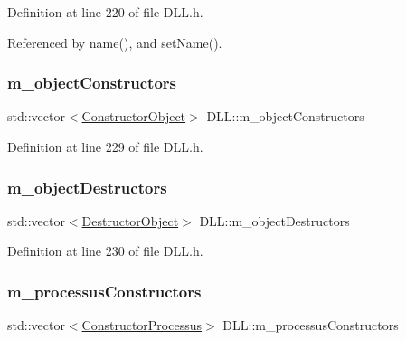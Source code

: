 Definition at line 220 of file D\+L\+L.\+h.



Referenced by name(), and set\+Name().

\mbox{\label{classDLL_a298d605445e22ef8147ae700848cd737}} 
\subsubsection{\texorpdfstring{m\+\_\+object\+Constructors}{m\_objectConstructors}}
{\footnotesize\ttfamily std\+::vector$<$\hyperlink{classDLL_a67b9601085a9f972b9ac6876cd11398e}{Constructor\+Object}$>$ D\+L\+L\+::m\+\_\+object\+Constructors\hspace{0.3cm}{\ttfamily [private]}}



Definition at line 229 of file D\+L\+L.\+h.

\mbox{\label{classDLL_a8c34d91e0a5ccfc34fff7c66f542b2d7}} 
\subsubsection{\texorpdfstring{m\+\_\+object\+Destructors}{m\_objectDestructors}}
{\footnotesize\ttfamily std\+::vector$<$\hyperlink{classDLL_a4400d330cd793ae5f883ffa58384f637}{Destructor\+Object}$>$ D\+L\+L\+::m\+\_\+object\+Destructors\hspace{0.3cm}{\ttfamily [private]}}



Definition at line 230 of file D\+L\+L.\+h.

\mbox{\label{classDLL_af9b49d23b767b742e38a7286de8e7c4d}} 
\subsubsection{\texorpdfstring{m\+\_\+processus\+Constructors}{m\_processusConstructors}}
{\footnotesize\ttfamily std\+::vector$<$\hyperlink{classDLL_afbf4c85f3517962642944b80833a3607}{Constructor\+Processus}$>$ D\+L\+L\+::m\+\_\+processus\+Constructors\hspace{0.3cm}{\ttfamily [private]}}



